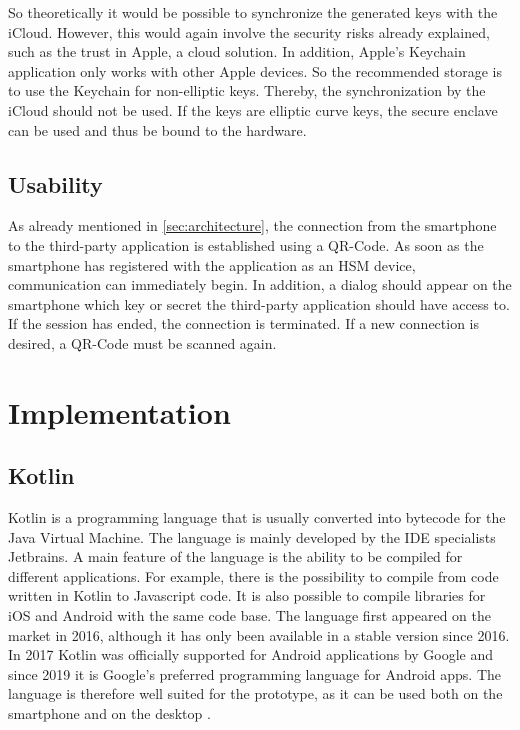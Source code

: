 \documentclass[12pt,oneside,a4paper,parskip]{scrbook}
\begin{document}
So theoretically it would be possible to synchronize the generated keys with the iCloud. However, this would again involve the security risks already explained, such as the trust in Apple, a cloud solution. In addition, Apple's Keychain application only works with other Apple devices. So the recommended storage is to use the Keychain for non-elliptic keys. Thereby, the synchronization by the iCloud should not be used. If the keys are elliptic curve keys, the secure enclave can be used and thus be bound to the hardware.

\section{Usability}
As already mentioned in \ref{sec:architecture}, the connection from the smartphone to the third-party application is established using a QR-Code. As soon as the smartphone has registered with the application as an HSM device, communication can immediately begin. In addition, a dialog should appear on the smartphone which key or secret the third-party application should have access to. If the session has ended, the connection is terminated. If a new connection is desired, a QR-Code must be scanned again.

\chapter{Implementation}

\section{Kotlin}
Kotlin is a programming language that is usually converted into bytecode for the Java Virtual Machine. The language is mainly developed by the IDE specialists Jetbrains. A main feature of the language is the ability to be compiled for different applications. For example, there is the possibility to compile from code written in Kotlin to Javascript code. It is also possible to compile libraries for iOS and Android with the same code base. The language first appeared on the market in 2016, although it has only been available in a stable version since 2016. In 2017 Kotlin was officially supported for Android applications by Google and since 2019 it is Google's preferred programming language for Android apps. 
The language is therefore well suited for the prototype, as it can be used both on the smartphone and on the desktop \parencite{lovis_ist_nodate}.
\end{document}

